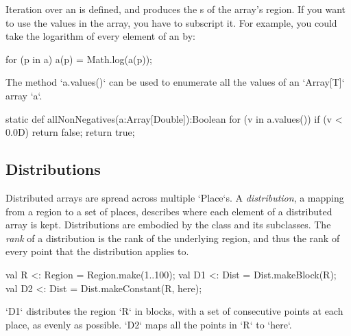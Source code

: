 Iteration over an  is defined, and produces the s of the
array's region.  If you want to use the values in the array, you have to
subscript it.  For example, you could take the logarithm of every element of an
 by: 
\begin{xten}
for (p in a) a(p) = Math.log(a(p));
\end{xten}


The method \xcd`a.values()` can be used to enumerate all the values of an \xcd`Array[T]` array \xcd`a`.
\begin{xten}
static def allNonNegatives(a:Array[Double]):Boolean {
 for (v in a.values()) if (v < 0.0D) return false;
 return true;
}
\end{xten}


\subsection{Distributions}\label{XtenDistributions}

Distributed arrays are spread across multiple \xcd`Place`s.  
A {\em distribution}, a mapping from a region to a set of places, 
describes where each element of a distributed array is kept.
Distributions are embodied by the class  and its
subclasses. 
The {\em rank} of a distribution is the rank of the underlying region, and
thus the rank of every point that the distribution applies to.


\begin{ex}
\begin{xten}
val R  <: Region = Region.make(1..100);
val D1 <: Dist = Dist.makeBlock(R);
val D2 <: Dist = Dist.makeConstant(R, here);
\end{xten}

\xcd`D1` distributes the region \xcd`R` in blocks, with a set of consecutive
points at each place, as evenly as possible.  \xcd`D2` maps all the points in
\xcd`R` to \xcd`here`.  
\end{ex}

